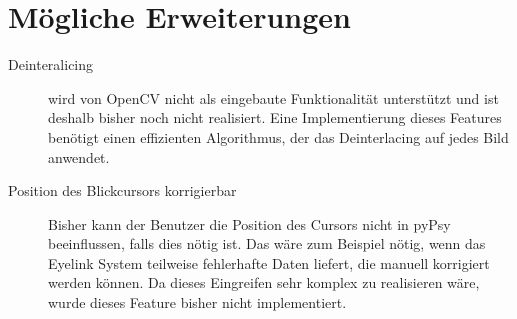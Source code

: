 \documentclass[a4paper,draft]{scrartcl}
\begin{document}
\section{M\"ogliche Erweiterungen}
  \begin{description}
    \item[Deinteralicing] wird von OpenCV nicht als eingebaute Funktionalität unterstützt und ist deshalb bisher noch nicht realisiert. Eine Implementierung dieses Features benötigt einen effizienten Algorithmus, der das Deinterlacing auf jedes Bild anwendet. 
    \item[Position des Blickcursors korrigierbar] Bisher kann der Benutzer die Position des Cursors nicht in pyPsy beeinflussen, falls dies nötig ist. Das wäre zum Beispiel nötig, wenn das Eyelink System teilweise fehlerhafte Daten liefert, die manuell korrigiert werden können. Da dieses Eingreifen sehr komplex zu realisieren wäre, wurde dieses Feature bisher nicht implementiert.
  \end{description}
\end{document}
